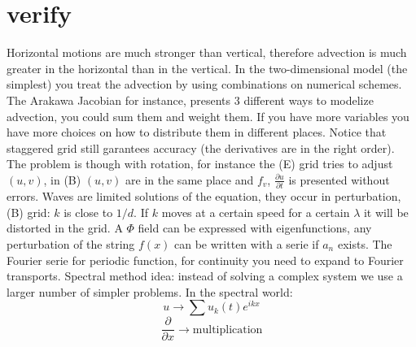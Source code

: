 \section{verify}
Horizontal motions are much stronger than vertical, therefore advection is much greater in the horizontal than in the vertical. In the two-dimensional model (the simplest) you treat the advection by using combinations on numerical schemes. The Arakawa Jacobian for instance, presents 3 different ways to modelize advection, you could sum them and weight them. If you have more variables you have more choices on how to distribute them in different places. Notice that staggered grid still garantees accuracy (the derivatives are in the right order). The problem is though with rotation, for instance the (E) grid tries to adjust $(u,v)$, in (B) $(u,v)$ are in the same place and $f_v$, $\frac{\partial u}{\partial t}$ is presented without errors. Waves are limited solutions of the equation, they occur in perturbation, (B) grid: $k$ is close to $1/d$. If $k$ moves at a certain speed for a certain $\lambda$ it will be distorted in the grid. A $\Phi$ field can be expressed with eigenfunctions, any perturbation of the string $f(x)$ can be written with a serie if $a_n$ exists. The Fourier serie for periodic function, for continuity you need to expand to Fourier transports. Spectral method idea: instead of solving a complex system we use a larger number of simpler problems. In the spectral world:
$$u\rightarrow\sum u_k(t)e^{ikx}$$
$$\frac{\partial}{\partial x}\rightarrow\text{multiplication}$$

